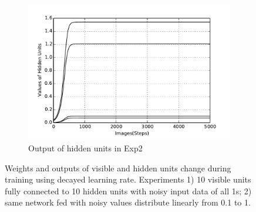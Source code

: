 \begin{figure}
\begin{subfigure}[t]{0.4\textwidth}
			\includegraphics[width=\textwidth]{pics_ae/exp2_hid_noisy_decay.pdf}
			\caption{Output of hidden units in Exp2}
		\end{subfigure}
		\caption{Weights and outputs of visible and hidden units change during training using decayed learning rate. 
			Experiments 1) 10 visible units fully connected to 10 hidden units with noisy input data of all 1s; 2) same network fed with noisy values distribute linearly from 0.1 to 1.}
	\end{figure}
	
